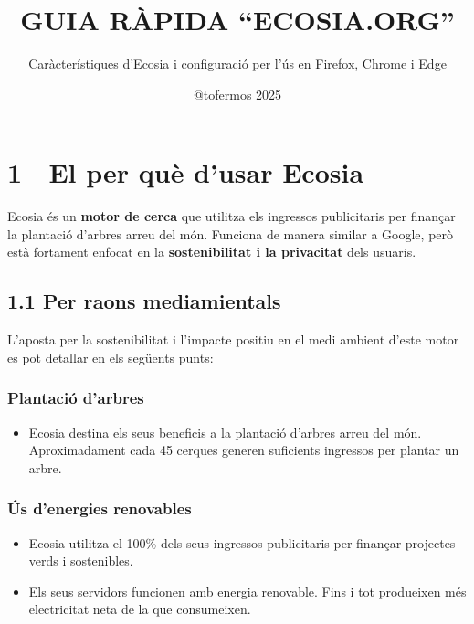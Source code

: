 \documentclass[
  a4paper,
]{article}
\title{GUIA RÀPIDA ``ECOSIA.ORG''}
\subtitle{Caràcterístiques d'Ecosia i configuració per l'ús en Firefox,
Chrome i Edge}
\author{@tofermos 2025}
\date{}
\providecommand{\tightlist}{%
  \setlength{\itemsep}{0pt}\setlength{\parskip}{0pt}}
\begin{document}
\maketitle

{
\setcounter{tocdepth}{2}
\tableofcontents
}
\newpage
\renewcommand\tablename{Tabla}

\section{1 🌱 El per què d'usar
Ecosia}\label{el-per-quuxe8-dusar-ecosia}

Ecosia és un \textbf{motor de cerca} que utilitza els ingressos
publicitaris per finançar la plantació d'arbres arreu del món. Funciona
de manera similar a Google, però està fortament enfocat en la
\textbf{sostenibilitat i la privacitat} dels usuaris.

\subsection{1.1 Per raons mediamientals}\label{per-raons-mediamientals}

L'aposta per la sostenibilitat i l'impacte positiu en el medi ambient
d'este motor es pot detallar en els següents punts:

\subsubsection{Plantació d'arbres}\label{plantaciuxf3-darbres}

\begin{itemize}
\tightlist
\item
  Ecosia destina els seus beneficis a la plantació d'arbres arreu del
  món. Aproximadament cada 45 cerques generen suficients ingressos per
  plantar un arbre.
\end{itemize}

\subsubsection{Ús d'energies
renovables}\label{uxfas-denergies-renovables}

\begin{itemize}
\tightlist
\item
  Ecosia utilitza el 100\% dels seus ingressos publicitaris per finançar
  projectes verds i sostenibles.
\item
  Els seus servidors funcionen amb energia renovable. Fins i tot
  produeixen més electricitat neta de la que consumeixen.
\end{itemize}
\end{document}
